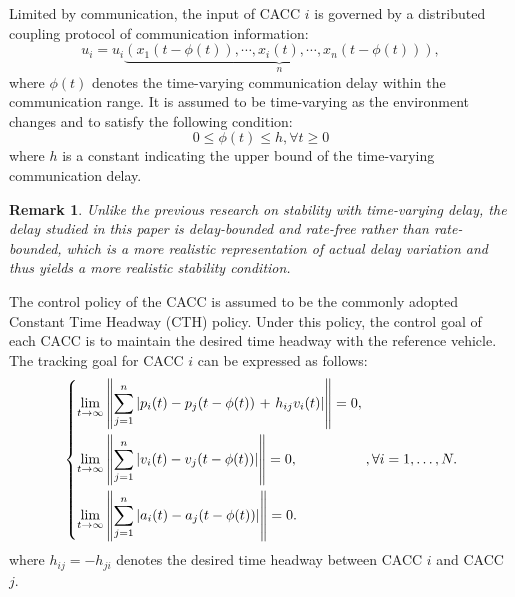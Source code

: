 \documentclass[a4paper]{cas-sc}
\newtheorem{remark}[theorem]{Remark}
\begin{document}
Limited by communication, the input of CACC $i$ is governed by a distributed coupling protocol of communication information:
\begin{equation}
  {u_i} = {u_i}\underbrace {\left( {{x_1}\left( {t - \phi(t)} \right), \cdots ,{x_i}\left( t \right), \cdots ,{x_n}\left( {t - \phi(t)} \right)} \right)}_n,
  \label{eq6}  
\end{equation}
where $\phi(t)$ denotes the time-varying communication delay within the communication range. It is assumed to be time-varying as the environment changes and to satisfy the following condition:
\begin{equation}
  0 \leq \phi(t)\leq h, \forall t \geq 0 
  \label{eq7}  
\end{equation}
where $h$ is a constant indicating the upper bound of the time-varying communication delay.

\begin{remark}
  \label{remark3}
  Unlike the previous research on stability with time-varying delay, the delay studied in this paper is delay-bounded and rate-free rather than rate-bounded, which is a more realistic representation of actual delay variation and thus yields a more realistic stability condition.
\end{remark}

The control policy of the CACC is assumed to be the commonly adopted Constant Time Headway (CTH) policy. Under this policy, the control goal of each CACC is to maintain the desired time headway with the reference vehicle. The tracking goal for CACC $i$ can be expressed as follows:
\begin{equation}
  \left\{ \begin{gathered}
    \mathop {\lim }\limits_{t \to \infty } \left\| {\sum\limits_{j = 1}^n {\left| {{p_i}(t) - {p_j}(t - \phi(t)){\text{ + }}{h_{ij}}{v_i}(t)} \right|} } \right\| = 0 \hfill, \\
    \mathop {\lim }\limits_{t \to \infty } \left\| {\sum\limits_{j = 1}^n {\left| {{v_i}(t) - {v_j}(t - \phi(t))} \right|} } \right\| = 0, \hfill \\
    \mathop {\lim }\limits_{t \to \infty } \left\| {\sum\limits_{j = 1}^n {\left| {{a_i}(t) - {a_j}(t - \phi(t))} \right|} } \right\| = 0. \hfill \\
  \end{gathered}  \right.,\forall i = 1, \ldots ,N.
  \label{eq8}
\end{equation}
where $h_{ij}=-h_{ji}$ denotes the desired time headway between CACC $i$ and CACC $j$.
\end{document}
